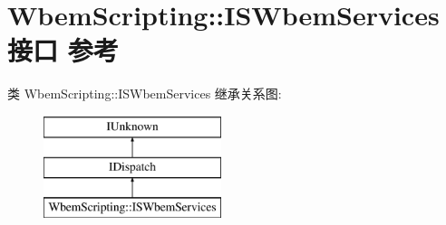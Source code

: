 \hypertarget{interface_wbem_scripting_1_1_i_s_wbem_services}{}\section{Wbem\+Scripting\+:\+:I\+S\+Wbem\+Services接口 参考}
\label{interface_wbem_scripting_1_1_i_s_wbem_services}
类 Wbem\+Scripting\+:\+:I\+S\+Wbem\+Services 继承关系图\+:\begin{figure}[H]
\begin{center}
\leavevmode
\includegraphics[height=3.000000cm]{interface_wbem_scripting_1_1_i_s_wbem_services}
\end{center}
\end{figure}
